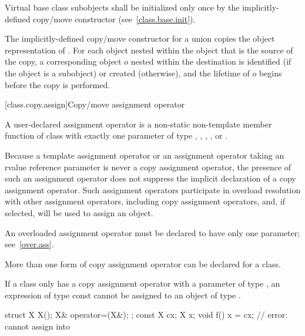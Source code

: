 %
Virtual base class subobjects shall be initialized only once by
the implicitly-defined copy/move constructor (see~\ref{class.base.init}).

\pnum
The implicitly-defined copy/move constructor for a union
 copies the object representation of .
For each object nested within
the object that is the source of the copy,
a corresponding object $o$ nested within the destination
is identified (if the object is a subobject) or created (otherwise),
and the lifetime of $o$ begins before the copy is performed.

[class.copy.assign]{Copy/move assignment operator}%

\pnum
{}%
%
%
%
%
%
%
A user-declared  assignment operator  is a
non-static non-template member function of class  with exactly one
parameter of type , , ,
, or .
\begin{footnote}
Because
a template assignment operator or an assignment operator
taking an rvalue reference parameter is never a copy assignment operator,
the presence of such an assignment operator does not suppress the
implicit declaration of a copy assignment operator. Such assignment operators
participate in overload resolution with other assignment operators, including
copy assignment operators, and, if selected, will be used to assign an object.
\end{footnote}
\begin{note}
An overloaded assignment operator must be declared to have only one parameter;
see~\ref{over.ass}.
\end{note}
\begin{note}
More than one form of copy assignment operator can be declared for a class.
\end{note}
\begin{note}
If a class
only has a copy assignment operator with a parameter of type
,
an expression of type const
cannot be assigned to an object of type
.
\begin{example}
\begin{codeblock}
struct X {
  X();
  X& operator=(X&);
};
const X cx;
X x;
void f() {
  x = cx;           // error:  cannot assign  into 
}
\end{codeblock}
\end{example}
\end{note}

